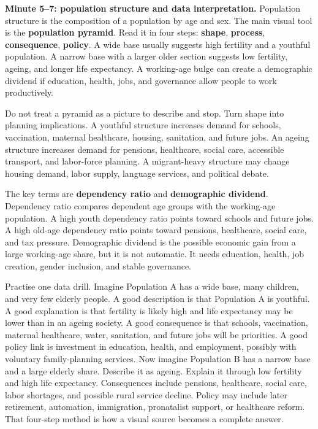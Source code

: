 \documentclass[11pt,a4paper]{article}
\newcommand{\term}[1]{\textcolor{HeadingBlue}{\textbf{#1}}}
\begin{document}
\textbf{Minute 5--7: population structure and data interpretation.}
Population structure is the composition of a population by age and sex. The
main visual tool is the \term{population pyramid}. Read it in four steps:
\term{shape}, \term{process}, \term{consequence}, \term{policy}. A wide base
usually suggests high fertility and a youthful population. A narrow base with a
larger older section suggests low fertility, ageing, and longer life expectancy.
A working-age bulge can create a demographic dividend if education, health, jobs,
and governance allow people to work productively.

Do not treat a pyramid as a picture to describe and stop. Turn shape into
planning implications. A youthful structure increases demand for schools,
vaccination, maternal healthcare, housing, sanitation, and future jobs. An
ageing structure increases demand for pensions, healthcare, social care,
accessible transport, and labor-force planning. A migrant-heavy structure may
change housing demand, labor supply, language services, and political debate.

The key terms are \term{dependency ratio} and \term{demographic dividend}.
Dependency ratio compares dependent age groups with the working-age population.
A high youth dependency ratio points toward schools and future jobs. A high
old-age dependency ratio points toward pensions, healthcare, social care, and
tax pressure. Demographic dividend is the possible economic gain from a large
working-age share, but it is not automatic. It needs education, health, job
creation, gender inclusion, and stable governance.

Practise one data drill. Imagine Population A has a wide base, many children,
and very few elderly people. A good description is that Population A is
youthful. A good explanation is that fertility is likely high and life
expectancy may be lower than in an ageing society. A good consequence is that
schools, vaccination, maternal healthcare, water, sanitation, and future jobs
will be priorities. A good policy link is investment in education, health, and
employment, possibly with voluntary family-planning services. Now imagine
Population B has a narrow base and a large elderly share. Describe it as
ageing. Explain it through low fertility and high life expectancy. Consequences
include pensions, healthcare, social care, labor shortages, and possible rural
service decline. Policy may include later retirement, automation, immigration,
pronatalist support, or healthcare reform. That four-step method is how a visual
source becomes a complete answer.
\end{document}
